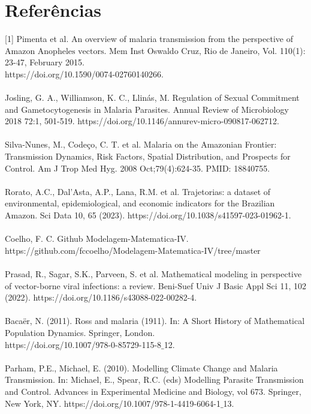 \documentclass[12pt]{article}
\begin{document}
\section{Referências}
[1] Pimenta et al. An overview of malaria transmission from the perspective of Amazon $\text{Anopheles vectors}$. Mem Inst Oswaldo Cruz, Rio de Janeiro, Vol. 110(1): 23-47, February 2015. 
\\https://doi.org/10.1590/0074-02760140266.  
\\\\
\noindent [2] Josling, G. A., Williamson, K. C., Llinás, M. Regulation of Sexual Commitment and Gametocytogenesis in Malaria Parasites. Annual Review of Microbiology 2018 72:1, 501-519. https://doi.org/10.1146/annurev-micro-090817-062712. 
\\\\
\noindent [3] Silva-Nunes, M., Codeço, C. T. et al. Malaria on the Amazonian Frontier: Transmission Dynamics, Risk Factors, Spatial Distribution, and Prospects for Control. Am J Trop Med Hyg. 2008 Oct;79(4):624-35. PMID: 18840755.
\\\\
\noindent [4] Rorato, A.C., Dal’Asta, A.P., Lana, R.M. et al. Trajetorias: a dataset of environmental, epidemiological, and economic indicators for the Brazilian Amazon. Sci Data 10, 65 (2023). https://doi.org/10.1038/s41597-023-01962-1.
\\\\
\noindent [5] Coelho, F. C. Github Modelagem-Matematica-IV. \\ https://github.com/fccoelho/Modelagem-Matematica-IV/tree/master
\\\\
\noindent [6] Prasad, R., Sagar, S.K., Parveen, S. et al. Mathematical modeling in perspective of vector-borne viral infections: a review. Beni-Suef Univ J Basic Appl Sci 11, 102 (2022). https://doi.org/10.1186/s43088-022-00282-4.
\\\\
\noindent [7] Bacaër, N. (2011). Ross and malaria (1911). In: A Short History of Mathematical Population Dynamics. Springer, London. \\ https://doi.org/10.1007/978-0-85729-115-8$\_$12.
\\\\
\noindent [8] Parham, P.E., Michael, E. (2010). Modelling Climate Change and Malaria Transmission. In: Michael, E., Spear, R.C. (eds) Modelling Parasite Transmission and Control. Advances in Experimental Medicine and Biology, vol 673. Springer, New York, NY. https://doi.org/10.1007/978-1-4419-6064-1$\_$13.
\end{document}
